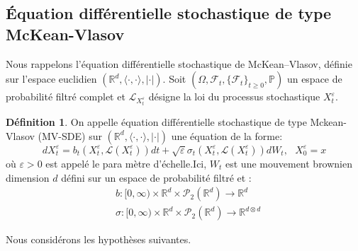 \documentclass[12pt,a4paper,twoside]{book}%
\theoremstyle{definition}
\newtheorem{dfn}{Définition}[section]
\numberwithin{equation}{section}
\begin{document}
\subsection{Équation différentielle stochastique de type McKean-Vlasov}
Nous rappelons l’équation différentielle stochastique de McKean–Vlasov, définie sur l’espace euclidien $(\mathbb{R}^d, \langle \cdot, \cdot \rangle ,|\cdot|)$. 
Soit $(\Omega,\mathcal{F}_t,\{\mathcal{F}_t\}_{t\geqslant 0},\mathbb{P})$ un espace de probabilité filtré complet et $\mathcal{L}_{X^\varepsilon_t}$ désigne la loi du processus stochastique $X^\varepsilon_t$.
\begin{dfn}
	On appelle équation différentielle stochastique de type Mckean-Vlasov (MV-SDE) sur $(\mathbb{R}^d, \langle \cdot, \cdot \rangle ,|\cdot|)$ une équation de la forme:
	\begin{equation}\label{eq:1.2.2}
		dX_t^\varepsilon = b_t(X_t^\varepsilon,\mathcal{L}(X_t^\varepsilon))dt +\sqrt{\varepsilon}\sigma_t(X_t^\varepsilon,\mathcal{L}(X_t^\varepsilon))dW_t,\text{    } X_0^\varepsilon=x
	\end{equation}
	où $\varepsilon > 0$ est appelé le para
	mètre d'échelle.Ici, $W_t$ est une mouvement brownien dimension $d$ défini sur un espace de probabilité filtré et :
	\[
	\begin{aligned}
	&b:[0,\infty) \times \mathbb{R}^d\times\mathcal{P}_2(\mathbb{R}^d)\longrightarrow\mathbb{R}^d\\
	&\sigma:[0,\infty) \times \mathbb{R}^d\times\mathcal{P}_2(\mathbb{R}^d)\longrightarrow\mathbb{R}^{d\otimes d}
	\end{aligned}
	\]
\end{dfn}
Nous considérons les hypothèses suivantes.
\end{document}
